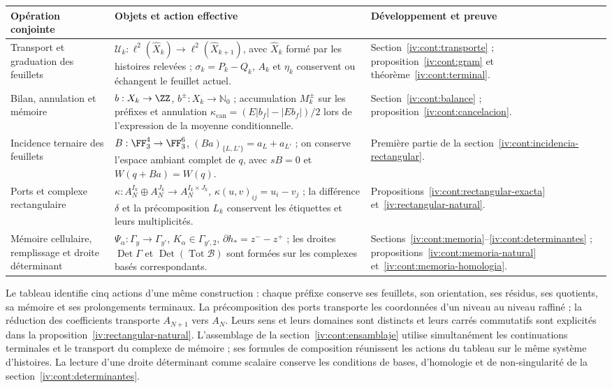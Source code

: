 \begin{center}
\small
\begin{tabular}{@{}p{.21\linewidth}p{.48\linewidth}p{.23\linewidth}@{}}
\toprule
Opération conjointe & Objets et action effective & Développement et preuve\\
\midrule
Transport et graduation des feuillets
& \(\mathcal U_k:\ell^2(\widehat X_k)\to
\ell^2(\widehat X_{k+1})\), avec \(\widehat X_k\) formé par les histoires relevées ; \(\sigma_k=P_k-Q_k\), \(A_k\) et \(\eta_k\) conservent ou échangent le feuillet actuel.
& Section~\ref{iv:cont:transporte} ; proposition~\ref{iv:cont:gram}
et théorème~\ref{iv:cont:terminal}.\\[5pt]
Bilan, annulation et mémoire
& \(b:X_k\to\ZZ\), \(b^\pm:X_k\to\mathbb N_0\) ;
accumulation \(M_k^\pm\) sur les préfixes et annulation
\(\kappa_{\mathrm{can}}=(E|b_f|-|Eb_f|)/2\) lors de l’expression de
la moyenne conditionnelle.
& Section~\ref{iv:cont:balance} ; proposition~\ref{iv:cont:cancelacion}.\\[5pt]
Incidence ternaire des feuillets
& \(B:\FF_3^4\to\FF_3^6\),
\((Ba)_{\{L,L'\}}=a_L+a_{L'}\) ; on conserve l’espace ambiant
complet de \(q\), avec \(sB=0\) et \(W(q+Ba)=W(q)\).
& Première partie de la section~\ref{iv:cont:incidencia-rectangular}.\\[5pt]
Ports et complexe rectangulaire
& \(\kappa:A_N^{I_k}\oplus A_N^{J_k}\to
A_N^{I_k\times J_k}\), \(\kappa(u,v)_{ij}=u_i-v_j\) ; la différence \(\delta\) et la précomposition \(L_k\) conservent les étiquettes et leurs multiplicités.
& Propositions~\ref{iv:cont:rectangular-exacta}
et~\ref{iv:rectangular-natural}.\\[5pt]
Mémoire cellulaire, remplissage et droite déterminant
& \(\Psi_\alpha:\Gamma_y\to\Gamma_{y'}\),
\(K_\alpha\in\Gamma_{y',2}\),
\(\partial h_*=z^--z^+\) ; les droites
\(\operatorname{Det}\Gamma\) et
\(\operatorname{Det}(\operatorname{Tot}\mathcal B)\)
sont formées sur les complexes basés correspondants.
& Sections~\ref{iv:cont:memoria}--\ref{iv:cont:determinantes} ;
propositions~\ref{iv:cont:memoria-natural}
et~\ref{iv:cont:memoria-homologia}.\\
\bottomrule
\end{tabular}
\end{center}

Le tableau identifie cinq actions d’une même construction : chaque
préfixe conserve ses feuillets, son orientation, ses résidus, ses quotients, sa mémoire
et ses prolongements terminaux. La précomposition des ports transporte les
coordonnées d’un niveau au niveau raffiné ; la réduction des coefficients
transporte \(A_{N+1}\) vers \(A_N\). Leurs sens et leurs domaines sont
distincts et leurs carrés commutatifs sont explicités dans la
proposition~\ref{iv:rectangular-natural}. L’assemblage de la
section~\ref{iv:cont:ensamblaje} utilise simultanément les
continuations terminales et le transport du complexe de mémoire ;
ses formules de composition réunissent les actions du tableau sur le
même système d’histoires. La lecture d’une droite déterminant
comme scalaire conserve les conditions de bases, d’homologie et de
non-singularité de la section~\ref{iv:cont:determinantes}.

